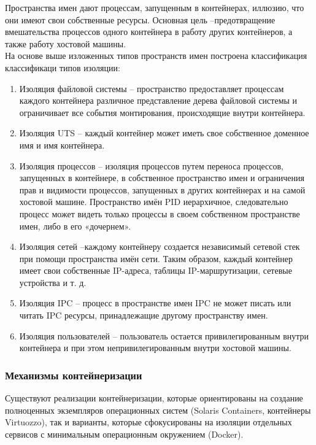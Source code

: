 \documentclass[a4paper,14pt]{extreport} %
\begin{document}
Пространства имен дают процессам, запущенным в контейнерах, иллюзию, что они имеют свои собственные ресурсы. Основная цель --предотвращение вмешательства процессов одного контейнера в работу других контейнеров, а также работу хостовой машины. \\
На основе выше изложенных типов пространств имен построена классификация классификаци типов изоляции:
\begin{enumerate}
\item Изоляция файловой системы -- пространство предоставляет процессам каждого контейнера различное представление дерева файловой системы и ограничивает все события монтирования, происходящие внутри контейнера.
\item Изоляция UTS -- каждый контейнер может иметь свое собственное доменное имя и имя контейнера.
\item Изоляция процессов -- изоляция процессов путем переноса процессов, запущенных в контейнере, в собственное пространство имен и ограничения прав и видимости процессов, запущенных в других контейнерах и на самой хостовой машине.  Пространство имён PID иерархичное, следовательно процесс может видеть только процессы в своем собственном пространстве имен, либо в его «дочернем». 
\item Изоляция сетей --каждому контейнеру создается независимый сетевой стек при помощи пространства имён сети. Таким образом, каждый контейнер имеет свои собственные IP-адреса, таблицы IP-маршрутизации, сетевые устройства и т. д.
\item Изоляция IPC -- процесс в пространстве имен IPC не может писать или читать IPC ресурсы, принадлежащие другому пространству имен.
\item Изоляция пользователей -- пользователь остается привилегированным внутри контейнера и при этом непривилегированным внутри хостовой машины.
\end{enumerate}

\newpage
\subsubsection{Механизмы контейнеризации}

Существуют реализации контейнеризации, которые ориентированы на создание полноценных экземпляров операционных систем (Solaris Containers, контейнеры Virtuozzo), так и варианты, которые сфокусированы на изоляции отдельных сервисов с минимальным операционным окружением (Docker).
\end{document}

